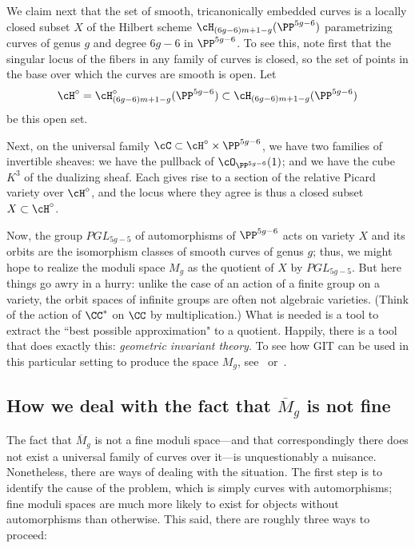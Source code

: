 We claim next that the set of smooth, tricanonically embedded curves is a locally closed subset $X$ of the Hilbert scheme $\cH_{(6g-6)m+1-g}(\PP^{5g-6})$ parametrizing curves of genus $g$ and degree $6g-6$ in $\PP^{5g-6}$. To see this, note first that the singular locus of the fibers in any family of curves is closed, so the set of points in the base over which the curves are smooth is open.  Let 
$$
\cH^\circ = \cH^\circ_{(6g-6)m+1-g}(\PP^{5g-6})\subset \cH_{(6g-6)m+1-g}(\PP^{5g-6})
$$
be this open set.

Next, on the universal family $\cC \subset \cH^\circ \times \PP^{5g-6}$, we have two families of invertible sheaves: we have the pullback of $\cO_{\PP^{5g-6}}(1)$; and we have the cube $K^3$ of the dualizing sheaf. Each gives rise to a section of the relative Picard variety over $\cH^\circ$, and the locus where they agree is thus a closed subset $X \subset \cH^\circ$.

Now, the group $PGL_{5g-5}$ of automorphisms of $\PP^{5g-6}$ acts on variety $X$ and its orbits
are the isomorphism classes of smooth curves of genus $g$; thus, we might hope to realize the moduli space $M_g$ as the quotient of $X$ by $PGL_{5g-5}$. But here things go awry in a hurry: unlike the case of an action of a finite group on a variety,
the orbit spaces of infinite groups are often not algebraic varieties. (Think of the action of $\CC^*$ on $\CC$ by multiplication.) What is needed is a tool to extract the ``best possible approximation" to a quotient. Happily, there is a tool that does exactly this:  \emph{geometric invariant theory}.  To see how GIT can be used in this particular setting to produce the space $M_g$, see~\cite{Mumford-Morrison} or~\cite{Harris-Morrison}.

\subsection{How we deal with the fact that $\overline M_g$ is not fine}

The fact that $\overline M_g$ is not a fine moduli space---and that correspondingly there does not exist a universal family of curves over it---is unquestionably a nuisance. Nonetheless, there are ways of dealing with the situation. The first step is to identify the cause of the problem, which is simply curves with automorphisms; fine moduli spaces are much more likely to exist for objects without automorphisms than  otherwise. This said, there are roughly three ways to proceed:


